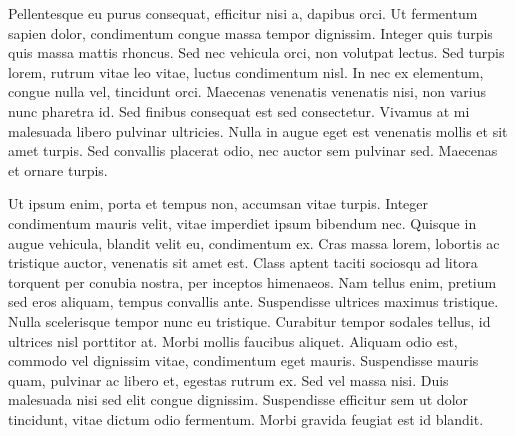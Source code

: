 Pellentesque eu purus consequat, efficitur nisi a, dapibus orci. Ut fermentum sapien dolor, condimentum congue massa tempor dignissim. Integer quis turpis quis massa mattis rhoncus. Sed nec vehicula orci, non volutpat lectus. Sed turpis lorem, rutrum vitae leo vitae, luctus condimentum nisl. In nec ex elementum, congue nulla vel, tincidunt orci. Maecenas venenatis venenatis nisi, non varius nunc pharetra id. Sed finibus consequat est sed consectetur. Vivamus at mi malesuada libero pulvinar ultricies. Nulla in augue eget est venenatis mollis et sit amet turpis. Sed convallis placerat odio, nec auctor sem pulvinar sed. Maecenas et ornare turpis.

Ut ipsum enim, porta et tempus non, accumsan vitae turpis. Integer condimentum mauris velit, vitae imperdiet ipsum bibendum nec. Quisque in augue vehicula, blandit velit eu, condimentum ex. Cras massa lorem, lobortis ac tristique auctor, venenatis sit amet est. Class aptent taciti sociosqu ad litora torquent per conubia nostra, per inceptos himenaeos. Nam tellus enim, pretium sed eros aliquam, tempus convallis ante. Suspendisse ultrices maximus tristique. Nulla scelerisque tempor nunc eu tristique. Curabitur tempor sodales tellus, id ultrices nisl porttitor at. Morbi mollis faucibus aliquet. Aliquam odio est, commodo vel dignissim vitae, condimentum eget mauris. Suspendisse mauris quam, pulvinar ac libero et, egestas rutrum ex. Sed vel massa nisi. Duis malesuada nisi sed elit congue dignissim. Suspendisse efficitur sem ut dolor tincidunt, vitae dictum odio fermentum. Morbi gravida feugiat est id blandit.